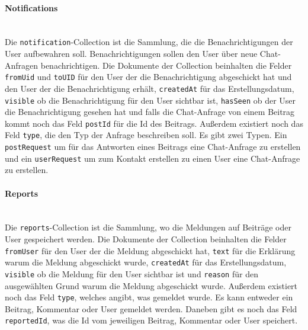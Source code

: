 \paragraph{Notifications}\mbox{} \\
Die \texttt{notification}-Collection ist die Sammlung, die die Benachrichtigungen der User aufbewahren soll. Benachrichtigungen sollen den User über neue Chat-Anfragen benachrichtigen. Die Dokumente der Collection beinhalten die Felder \texttt{fromUid} und \texttt{toUID} für den User der die Benachrichtigung abgeschickt hat und den User der die Benachrichtigung erhält, \texttt{createdAt} für das Erstellungsdatum, \texttt{visible} ob die Benachrichtigung für den User sichtbar ist, \texttt{hasSeen} ob der User die Benachrichtigung gesehen hat und falls die Chat-Anfrage von einem Beitrag kommt noch das Feld \texttt{postId} für die Id des Beitrags. Außerdem existiert noch das Feld \texttt{type}, die den Typ der Anfrage beschreiben soll. Es gibt zwei Typen. Ein \texttt{postRequest} um für das Antworten eines Beitrags eine Chat-Anfrage zu erstellen und ein \texttt{userRequest} um zum Kontakt erstellen zu einen User eine Chat-Anfrage zu erstellen.

\paragraph{Reports}\mbox{} \\
Die \texttt{reports}-Collection ist die Sammlung, wo die Meldungen auf Beiträge oder User gespeichert werden. Die Dokumente der Collection beinhalten die Felder \texttt{fromUser} für den User der die Meldung abgeschickt hat, \texttt{text} für die Erklärung warum die Meldung abgeschickt wurde, \texttt{createdAt} für das Erstellungsdatum, \texttt{visible} ob die Meldung für den User sichtbar ist und \texttt{reason} für den ausgewählten Grund warum die Meldung abgeschickt wurde. Außerdem existiert noch das Feld \texttt{type}, welches angibt, was gemeldet wurde. Es kann entweder ein Beitrag, Kommentar oder User gemeldet werden. Daneben gibt es noch das Feld \texttt{reportedId}, was die Id vom jeweiligen Beitrag, Kommentar oder User speichert.

